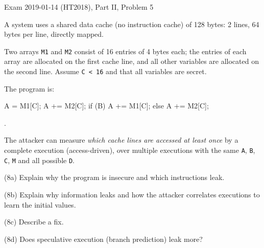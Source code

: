 \documentclass[12pt, a4paper]{article}
\begin{document}
\begin{practicebox}{Exam 2019-01-14 (HT2018), Part II, Problem 5}
\begin{problembox}
A system uses a shared data cache (no instruction cache) of 128 bytes: 2 lines, 64 bytes per line, directly mapped.

Two arrays \texttt{M1} and \texttt{M2} consist of 16 entries of 4 bytes each; the entries of each array are allocated on the first cache line, and all other variables are allocated on the second line. Assume \texttt{C < 16} and that all variables are secret.

The program is:
\begin{codebox}
A = M1[C];
A += M2[C];
if (B) {
    A += M1[C];
} else {
    A += M2[C];
}
\end{codebox}.

The attacker can measure \emph{which cache lines are accessed at least once} by a complete execution (access-driven), over multiple executions with the same \texttt{A}, \texttt{B}, \texttt{C}, \texttt{M} and all possible \texttt{D}.

(8a) Explain why the program is insecure and which instructions leak.

(8b) Explain why information leaks and how the attacker correlates executions to learn the initial values.

(8c) Describe a fix.

(8d) Does speculative execution (branch prediction) leak more?
\end{problembox}


\end{practicebox}
\end{document}
